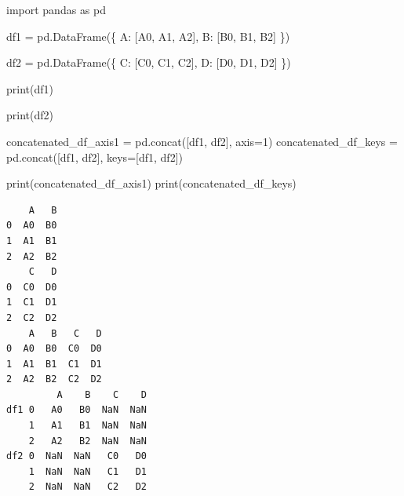 \documentclass[
  english,
  letterpaper,
  DIV=11,
  numbers=noendperiod]{scrreprt}
\newenvironment{Shaded}{\begin{snugshade}}{\end{snugshade}}
\newcommand{\BuiltInTok}[1]{\textcolor[rgb]{0.00,0.23,0.31}{#1}}
\newcommand{\DecValTok}[1]{\textcolor[rgb]{0.68,0.00,0.00}{#1}}
\newcommand{\ImportTok}[1]{\textcolor[rgb]{0.00,0.46,0.62}{#1}}
\newcommand{\NormalTok}[1]{\textcolor[rgb]{0.00,0.23,0.31}{#1}}
\newcommand{\OperatorTok}[1]{\textcolor[rgb]{0.37,0.37,0.37}{#1}}
\newcommand{\StringTok}[1]{\textcolor[rgb]{0.13,0.47,0.30}{#1}}
\begin{document}
\begin{Shaded}
\begin{Highlighting}[]
\ImportTok{import}\NormalTok{ pandas }\ImportTok{as}\NormalTok{ pd}

\NormalTok{df1 }\OperatorTok{=}\NormalTok{ pd.DataFrame(\{}
    \StringTok{\textquotesingle{}A\textquotesingle{}}\NormalTok{: [}\StringTok{\textquotesingle{}A0\textquotesingle{}}\NormalTok{, }\StringTok{\textquotesingle{}A1\textquotesingle{}}\NormalTok{, }\StringTok{\textquotesingle{}A2\textquotesingle{}}\NormalTok{],}
    \StringTok{\textquotesingle{}B\textquotesingle{}}\NormalTok{: [}\StringTok{\textquotesingle{}B0\textquotesingle{}}\NormalTok{, }\StringTok{\textquotesingle{}B1\textquotesingle{}}\NormalTok{, }\StringTok{\textquotesingle{}B2\textquotesingle{}}\NormalTok{]}
\NormalTok{\})}

\NormalTok{df2 }\OperatorTok{=}\NormalTok{ pd.DataFrame(\{}
    \StringTok{\textquotesingle{}C\textquotesingle{}}\NormalTok{: [}\StringTok{\textquotesingle{}C0\textquotesingle{}}\NormalTok{, }\StringTok{\textquotesingle{}C1\textquotesingle{}}\NormalTok{, }\StringTok{\textquotesingle{}C2\textquotesingle{}}\NormalTok{],}
    \StringTok{\textquotesingle{}D\textquotesingle{}}\NormalTok{: [}\StringTok{\textquotesingle{}D0\textquotesingle{}}\NormalTok{, }\StringTok{\textquotesingle{}D1\textquotesingle{}}\NormalTok{, }\StringTok{\textquotesingle{}D2\textquotesingle{}}\NormalTok{]}
\NormalTok{\})}

\BuiltInTok{print}\NormalTok{(df1)}

\BuiltInTok{print}\NormalTok{(df2)}

\NormalTok{concatenated\_df\_axis1 }\OperatorTok{=}\NormalTok{ pd.concat([df1, df2], axis}\OperatorTok{=}\DecValTok{1}\NormalTok{)}
\NormalTok{concatenated\_df\_keys }\OperatorTok{=}\NormalTok{ pd.concat([df1, df2], keys}\OperatorTok{=}\NormalTok{[}\StringTok{\textquotesingle{}df1\textquotesingle{}}\NormalTok{, }\StringTok{\textquotesingle{}df2\textquotesingle{}}\NormalTok{])}

\BuiltInTok{print}\NormalTok{(concatenated\_df\_axis1)}
\BuiltInTok{print}\NormalTok{(concatenated\_df\_keys)}
\end{Highlighting}
\end{Shaded}

\begin{verbatim}
    A   B
0  A0  B0
1  A1  B1
2  A2  B2
    C   D
0  C0  D0
1  C1  D1
2  C2  D2
    A   B   C   D
0  A0  B0  C0  D0
1  A1  B1  C1  D1
2  A2  B2  C2  D2
         A    B    C    D
df1 0   A0   B0  NaN  NaN
    1   A1   B1  NaN  NaN
    2   A2   B2  NaN  NaN
df2 0  NaN  NaN   C0   D0
    1  NaN  NaN   C1   D1
    2  NaN  NaN   C2   D2
\end{verbatim}
\end{document}

